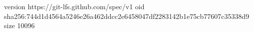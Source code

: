 version https://git-lfs.github.com/spec/v1
oid sha256:744d1d4564a5246e26a462ddcc2e6458047df2283142b1e75cb77607c35338d9
size 10096
